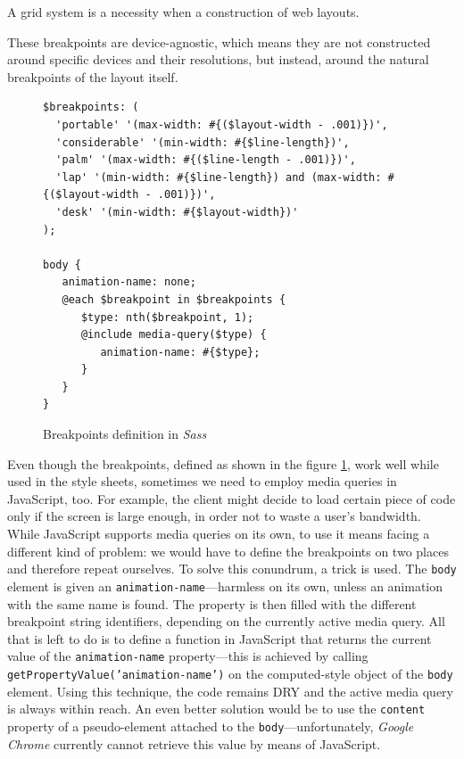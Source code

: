 \documentclass[thesis=M,english,hidelinks]{FITthesis}[2012/10/20]
\newcommand{\code}{\texttt}
\begin{document}
A grid system is a necessity when a construction of web layouts.

These breakpoints are device-agnostic, which means they are not constructed around specific devices and their resolutions, but instead, around the natural breakpoints of the layout itself.

\begin{figure}[h]
  \begin{lstlisting}
$breakpoints: (
  'portable' '(max-width: #{($layout-width - .001)})',
  'considerable' '(min-width: #{$line-length})',
  'palm' '(max-width: #{($line-length - .001)})',
  'lap' '(min-width: #{$line-length}) and (max-width: #{($layout-width - .001)})',
  'desk' '(min-width: #{$layout-width})'
);

body {
   animation-name: none;
   @each $breakpoint in $breakpoints {
      $type: nth($breakpoint, 1);
      @include media-query($type) {
         animation-name: #{$type};
      }
   }
}
  \end{lstlisting}
  \caption{Breakpoints definition in \textit{Sass}}
  \label{fig:sass_breakpoints}
\end{figure}

Even though the breakpoints, defined as shown in the figure \ref{fig:sass_breakpoints}, work well while used in the style sheets, sometimes we need to employ media queries in JavaScript, too. For example, the client might decide to load certain piece of code only if the screen is large enough, in order not to waste a user's bandwidth. While JavaScript supports media queries on its own, to use it means facing a different kind of problem: we would have to define the breakpoints on two places and therefore repeat ourselves. To solve this conundrum, a trick is used. The \code{body} element is given an \code{animation-name}---harmless on its own, unless an animation with the same name is found. The property is then filled with the different breakpoint string identifiers, depending on the currently active media query. All that is left to do is to define a function in JavaScript that returns the current value of the \code{animation-name} property---this is achieved by calling \code{getPropertyValue('animation-name')} on the computed-style object of the \code{body} element. Using this technique, the code remains DRY and the active media query is always within reach. An even better solution would be to use the \code{content} property of a pseudo-element attached to the \code{body}---unfortunately, \textit{Google Chrome} currently cannot retrieve this value by means of JavaScript.
\end{document}
